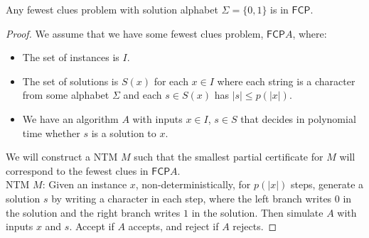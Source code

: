 \documentclass[runningheads,a4paper]{llncs}
\begin{document}
\begin{proposition}
\label{prop:fewesttofcp}
Any fewest clues problem with solution alphabet $\Sigma = \{ 0 ,1 \}$ is in $\mathsf{FCP}$.
\end{proposition}

\begin{proof}
We assume that we have some fewest clues problem, $\mathsf{FCP} A$, where:
\begin{itemize}
\item The set of instances is $I$.
\item The set of solutions is $S(x)$ for each $x \in I$ where each string is a character from some alphabet $\Sigma$ and each $s \in S(x)$ has $|s| \leq p(|x|)$.
\item We have an algorithm $A$ with inputs $x \in I$, $s \in S$ that decides in polynomial time whether $s$ is a solution to $x$.
\end{itemize}
We will construct a NTM $M$ such that the smallest partial certificate for $M$ will correspond to the fewest clues in $\mathsf{FCP} A$. \\
NTM $M$: Given an instance $x$, non-deterministically, for $p(|x|)$ steps, generate a solution $s$ by writing a character in each step, where the left branch writes $0$ in the solution and the right branch writes $1$ in the solution. Then simulate $A$ with inputs $x$ and $s$. Accept if $A$ accepts, and reject if $A$ rejects. 


\end{proof}
\end{document}
